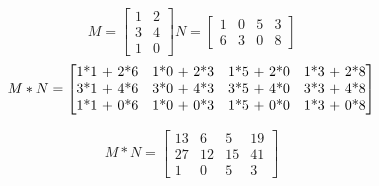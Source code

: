 \documentclass{article}
\begin{document}
\[
M=
  \begin{bmatrix}
    1 & 2 \\
    3 & 4 \\
    1 & 0
  \end{bmatrix}
  N=
\begin{bmatrix}
1 & 0 & 5 & 3\\
6 & 3 & 0 & 8

\end{bmatrix}
\]
\[
M*N=
\begin{bmatrix}
$1*1 + 2*6$ & $1*0 + 2*3$ & $1*5 + 2*0$ & $1*3 + 2*8$\\
$3*1 + 4*6$ & $3*0 + 4*3$ & $3*5 + 4*0$ & $3*3 + 4*8$ \\
$1*1 + 0*6$ & $1*0 + 0*3$ & $1*5 + 0*0$ & $1*3 + 0*8$ 
\end{bmatrix}
\]

\[
M*N=\begin{bmatrix}
13 & 6 & 5 & 19\\
27 & 12 & 15 & 41\\
1 & 0 & 5 & 3 
\end{bmatrix}
\]
\end{document}
